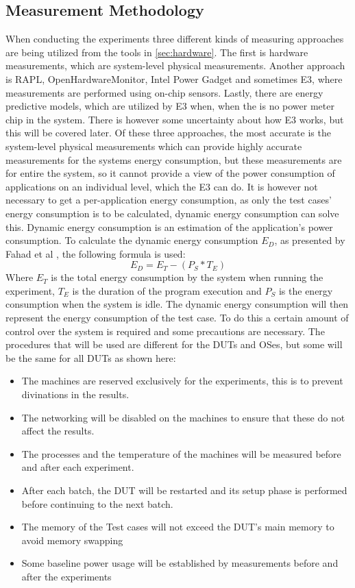 \subsection{Measurement Methodology}
When conducting the experiments three different kinds of measuring approaches are being utilized from the tools in \cref{sec:hardware}.
The first is hardware measurements, which are system-level physical measurements. Another approach is RAPL, OpenHardwareMonitor, Intel Power Gadget and sometimes E3, where measurements are performed using on-chip sensors. Lastly, there are energy predictive models, which are utilized by E3 when, when the is no power meter chip in the system. There is however some uncertainty about how E3 works, but this will be covered later. Of these three approaches, the most accurate is the system-level physical measurements which can provide highly accurate measurements for the systems energy consumption, but these measurements are for entire the system, so it cannot provide a view of the power consumption of applications on an individual level, which the E3 can do. It is however not necessary to get a per-application energy consumption, as only the test cases' energy consumption is to be calculated, dynamic energy consumption can solve this. Dynamic energy consumption is an estimation of the application's power consumption. To calculate the dynamic energy consumption $E_D$, as presented by Fahad et al \cite{fahad2019comparative}, the following formula is used:
$$E_D = E_T -(P_S * T_E)$$
Where $E_T$ is the total energy consumption by the system when running the experiment, $T_E$ is the duration of the program execution and $P_S$ is the energy consumption when the system is idle. The dynamic energy consumption will then represent the energy consumption of the test case. To do this a certain amount of control over the system is required and some precautions are necessary. The procedures that will be used are different for the DUTs and OSes, but some will be the same for all DUTs as shown here:\cite*{fahad2019comparative}

\begin{itemize}
    \item The machines are reserved exclusively for the experiments, this is to prevent divinations in the results.
    \item The networking will be disabled on the machines to ensure that these do not affect the results.
    \item The processes and the temperature of the machines will be measured before and after each experiment.
    \item After each batch, the DUT will be restarted and its setup phase is performed before continuing to the next batch.
    \item The memory of the Test cases will not exceed the DUT's main memory to avoid memory swapping
    \item Some baseline power usage will be established by measurements before and after the experiments
\end{itemize}

